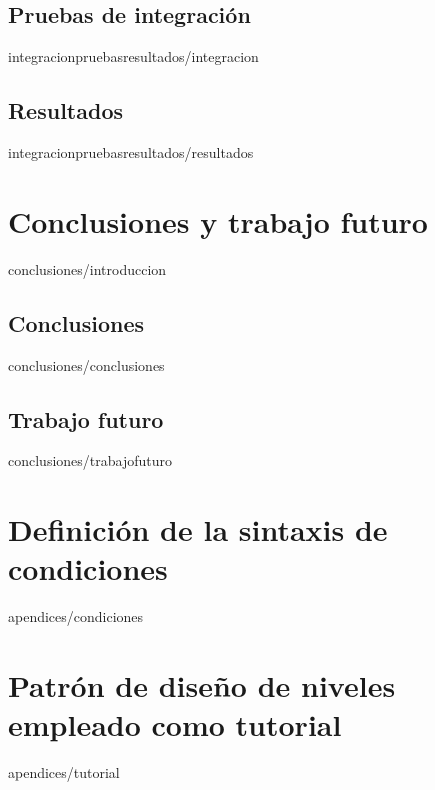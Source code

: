 \documentclass[epsbased,copyright,final,printable,covers,extendedindex,firstnumbered,tfg,gnuplot]{tfgtfmthesisuam}
\begin{document}
	\section{Pruebas de integración\label{SEC:PRUEBASINTEGRACION}}{integracionpruebasresultados/integracion}
	\section{Resultados\label{SEC:RESULTADOS}}{integracionpruebasresultados/resultados}

\chapter{Conclusiones y trabajo futuro\label{CAP:CONCLUSIONES}}{conclusiones/introduccion}
	\section{Conclusiones\label{SEC:CONCLUSIONES}}{conclusiones/conclusiones}
	\section{Trabajo futuro\label{SEC:TRABAJOFUTURO}}{conclusiones/trabajofuturo}

\appendix

\chapter{Definición de la sintaxis de condiciones\label{CAP:APCONDICIONES}}{apendices/condiciones}
\chapter{Patrón de diseño de niveles empleado como tutorial\label{CAP:APTUTORIAL}}{apendices/tutorial}
\end{document}

